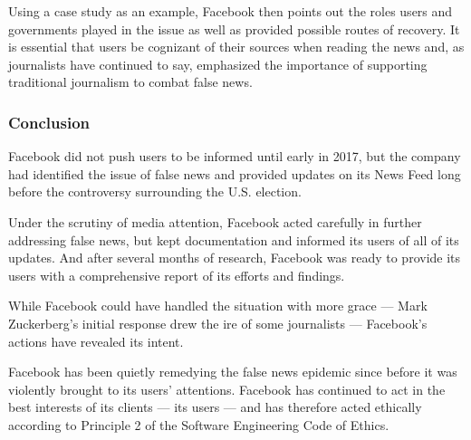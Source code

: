 
\par Using a case study as an example, Facebook then points out the roles users and governments played in the issue as well as provided possible routes of recovery. It is essential that users be cognizant of their sources when reading the news and, as journalists have continued to say, \cite{ted_velshi,ted_becka} emphasized the importance of supporting traditional journalism to combat false news. \cite{fb_info_ops}

\subsubsection{Conclusion}

\par Facebook did not push users to be informed until early in 2017, \cite{guardian_tips} but the company had identified the issue of false news and provided updates on its News Feed long before the controversy surrounding the U.S. election. \cite{fb_hoaxes_2015}

\par Under the scrutiny of media attention, Facebook acted carefully in further addressing false news, but kept documentation and informed its users of all of its updates. \cite{zuck_resp_b} And after several months of research, Facebook was ready to provide its users with a comprehensive report of its efforts and findings. \cite{fb_info_ops}

\par While Facebook could have handled the situation with more grace --- Mark Zuckerberg's initial response drew the ire of some journalists \cite{tc_responsibility} --- Facebook's actions have revealed its intent.

\par Facebook has been quietly remedying the false news epidemic since before it was violently brought to its users' attentions. Facebook has continued to act in the best interests of its clients --- its users --- and has therefore acted ethically according to Principle 2 of the Software Engineering Code of Ethics.